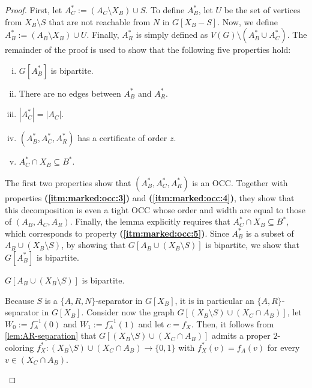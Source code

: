 \begin{proof}
	First, let $A_C^\ast := (A_C \setminus X_B) \cup S$. To define $A_B^\ast$, let $U$ be the set of vertices from $X_B \setminus S$ that are not reachable from $N$ in $G[X_B - S]$. Now, we define $A_B^\ast := (A_B \setminus X_B) \cup U$. Finally, $A_R^\ast$ is simply defined as $V(G) \setminus (A_B^\ast \cup A_C^\ast)$. The remainder of the proof is used to show that the following five properties hold:
	\begin{enumerate}[(i)]
		\item \label{itm:marked:occ:1} $G[A_B^\ast]$ is bipartite.
		\item \label{itm:marked:occ:2} There are no edges between $A_B^\ast$ and $A_R^\ast$.
		\item \label{itm:marked:occ:3} $|A_C^\ast| = |A_C|$.
		\item \label{itm:marked:occ:4} $(A_B^\ast, A_C^\ast, A_R^\ast)$ has a certificate of order $z$.
		\item \label{itm:marked:occ:5} $A_C^\ast \cap X_B \subseteq B^\ast$.
	\end{enumerate}
	The first two properties show that $(A_B^\ast, A_C^\ast, A_R^\ast)$ is an OCC. Together with properties \textbf{(\ref{itm:marked:occ:3})} and \textbf{(\ref{itm:marked:occ:4})}, they show that this decomposition is even a tight OCC whose order and width are equal to those of $(A_B, A_C, A_R)$. Finally, the lemma explicitly requires that $A_C^\ast \cap X_B \subseteq B^\ast$, which corresponds to property \textbf{(\ref{itm:marked:occ:5})}.
	 Since $A_B^\ast$ is a subset of $A_B \cup (X_B \setminus S)$, by showing that $G[A_B \cup (X_B \setminus S)]$ is bipartite, we show that $G[A_B^\ast]$ is bipartite.
	\begin{claim} \label{clm:ab:xb:bipartite}
		$G[A_B \cup (X_B \setminus S)]$ is bipartite.
	\end{claim}
	\begin{claimproof}
		Because $S$ is a $\{A, R, N\}$-separator in $G[X_B]$, it is in particular an $\{A, R\}$-separator in $G[X_B]$. Consider now the graph $G[(X_B \setminus S) \cup (X_C \cap A_B)]$, let $W_0 := f_A^{-1}(0)$ and $W_1 := f_A^{-1}(1)$ and let $c = f_X$. Then, it follows from \cref{lem:AR-separation} that $G[(X_B \setminus S) \cup (X_C \cap A_B)]$ admits a proper $2$-coloring $f_X^\ast \colon (X_B \setminus S) \cup (X_C \cap A_B) \rightarrow \{0,1\}$ with $f_X^\ast(v) = f_A(v)$ for every $v \in (X_C \cap A_B)$.
		

\end{claimproof}
\end{proof}
